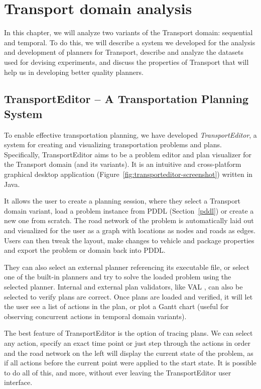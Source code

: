 \chapter{Transport domain analysis}

In this chapter, we will analyze two variants of the Transport domain: sequential and temporal. To do this, we will describe a system we developed for the analysis
and development of planners for Transport, describe and analyze the datasets
used for devising experiments, and discuss the properties of Transport
that will help us in developing better quality planners.

\section{TransportEditor -- A Transportation Planning System}\label{transport-editor}

To enable effective transportation planning,
we have developed \textit{TransportEditor}, a system for creating and visualizing transportation problems and plans.
Specifically, TransportEditor aims to be a problem editor and plan visualizer for the Transport domain (and its variants). It is an intuitive and cross-platform graphical desktop application (Figure~\ref{fig:transporteditor-screenshot})
written in Java.

It allows the user to create a planning session, where they
select a Transport domain variant, load a problem instance from PDDL (Section~\ref{pddl}) or create a new one from scratch.
The road network of the problem is automatically laid out and visualized for the user as a graph with locations as nodes and roads as edges.
Users can then tweak the layout, make changes to vehicle and package properties
and export the problem or domain back into PDDL.

They can also select an external planner
referencing its executable file, or select one of the built-in planners and try to solve
the loaded problem using the selected planner. Internal and external plan validators, like VAL \citep{Howey2003}, can also be selected to verify plans are correct.
Once plans are loaded and verified, it will let the user see a list of actions
in the plan, or plot a Gantt chart (useful for observing concurrent actions in temporal domain variants).

The best feature of TransportEditor is the option of tracing plans. We can select
any action, specify an exact time point or just step through the actions in order and
the road network on the left will display the current state of the problem, as if
all actions before the current point were applied to the start state.
It is possible to do all of this, and more, without ever leaving the TransportEditor user interface.

